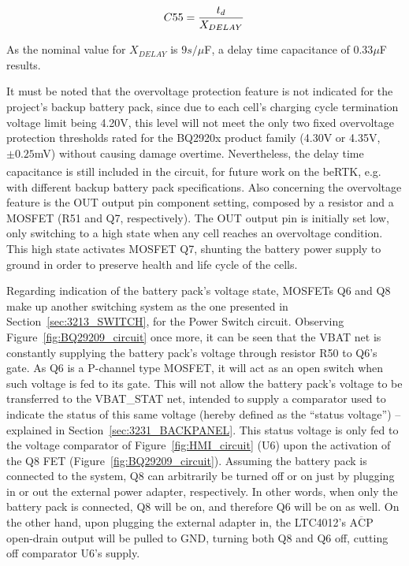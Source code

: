 \begin{equation}\label{eq:CCD}
	C55=\frac{t_d}{X_{DELAY}}\,\medskip
\end{equation}

\noindent As the nominal value for $X_{DELAY}$ is $9s/ \mu$F, a delay time capacitance of $0.33 \mu$F results.

It must be noted that the overvoltage protection feature is not indicated for the project's backup battery pack, since due to each cell's charging cycle termination voltage limit being 4.20V, this level will not meet the only two fixed overvoltage protection thresholds rated for the BQ2920x product family (4.30V or 4.35V, $\pm 0.25$mV) without causing damage overtime. Nevertheless, the delay time capacitance is still included in the circuit, for future work on the beRTK\textsuperscript{\textregistered}, e.g. with different backup battery pack specifications. Also concerning the overvoltage feature is the OUT output pin component setting, composed by a resistor and a MOSFET (R51 and Q7, respectively). The OUT output pin is initially set low, only switching to a high state when any cell reaches an overvoltage condition. This high state activates MOSFET Q7, shunting the battery power supply to ground in order to preserve health and life cycle of the cells.

Regarding indication of the battery pack's voltage state, MOSFETs Q6 and Q8 make up another switching system as the one presented in Section~\ref{sec:3213_SWITCH}, for the Power Switch circuit. Observing Figure~\ref{fig:BQ29209_circuit} once more, it can be seen that the VBAT net is constantly supplying the battery pack's voltage through resistor R50 to Q6's gate. As Q6 is a P-channel type MOSFET, it will act as an open switch when such voltage is fed to its gate. This will not allow the battery pack's voltage to be transferred to the VBAT\_STAT net, intended to supply a comparator used to indicate the status of this same voltage (hereby defined as the ``status voltage'') -- explained in Section~\ref{sec:3231_BACKPANEL}. This status voltage is only fed to the voltage comparator of Figure~\ref{fig:HMI_circuit} (U6) upon the activation of the Q8 FET (Figure~\ref{fig:BQ29209_circuit}). Assuming the battery pack is connected to the system, Q8 can arbitrarily be turned off or on just by plugging in or out the external power adapter, respectively. In other words, when only the battery pack is connected, Q8 will be on, and therefore Q6 will be on as well. On the other hand, upon plugging the external adapter in, the LTC4012's $\overline{\mbox{ACP}}$ open-drain output will be pulled to GND, turning both Q8 and Q6 off, cutting off comparator U6's supply.

